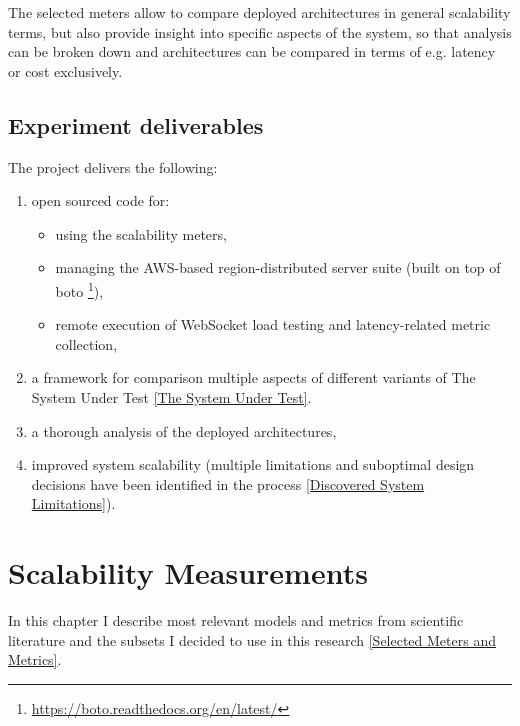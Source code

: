 \documentclass{uvamscse}
\begin{document}
The selected meters allow to compare deployed architectures in general scalability terms, but also provide insight into specific aspects of the system, so that analysis can be broken down and architectures can be compared in terms of e.g. latency or cost exclusively.

\section{Experiment deliverables}\label{Experiment deliverables}

The project delivers the following:
\begin{enumerate}
  \item open sourced code for:
  \begin{itemize}
    \item using the scalability meters,
    \item managing the AWS-based region-distributed server suite (built on top of boto \footnote{\url{https://boto.readthedocs.org/en/latest/}}),
    \item remote execution of WebSocket load testing and latency-related metric collection,
  \end{itemize}
  \item a framework for comparison multiple aspects of different variants of The System Under Test \ref{The System Under Test}.
  \item a thorough analysis of the deployed architectures,
  \item improved system scalability (multiple limitations and suboptimal design decisions have been identified in the process \ref{Discovered System Limitations}).
\end{enumerate}


\chapter{Scalability Measurements} \label{Scalability Measurements}
In this chapter I describe most relevant models and metrics from scientific literature and the subsets I decided to use in this research \ref{Selected Meters and Metrics}.
\end{document}
